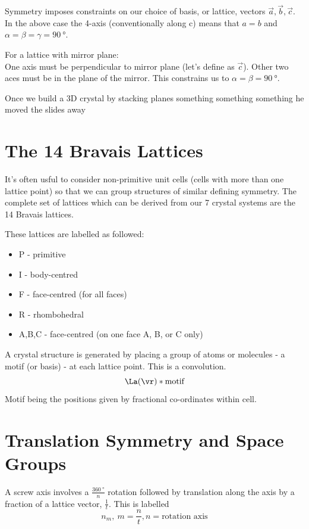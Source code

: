 \documentclass[a4paper, 11pt, normalem]{report}
\begin{document}
Symmetry imposes constraints on our choice of basis, or lattice, vectors $\vec{a},\vec{b},\vec{c}$.
In the above case the 4-axis (conventionally along c) means that $a=b$ and $\alpha=\beta=\gamma=\SI{90}{\degree}$.

For a lattice with mirror plane:\\
One axis must be perpendicular to mirror plane (let's define as $\vec{c}$).
Other two aces must be in the plane of the mirror.
This constrains us to $\alpha=\beta=\SI{90}{\degree}$.

Once we build a 3D crystal by stacking planes something something something he moved the slides away

\section{The 14 Bravais Lattices}
It's often usful to consider non-primitive unit cells (cells with more than one lattice point) so that we can group structures of similar defining symmetry.
The complete set of lattices which can be derived from our 7 crystal systems are the 14 Bravais lattices.

These lattices are labelled as followed:
\begin{itemize}
    \item P - primitive
    \item I - body-centred
    \item F - face-centred (for all faces)
    \item R - rhombohedral
    \item A,B,C - face-centred (on one face A, B, or C only)
\end{itemize}
A crystal structure is generated by placing a group of atoms or molecules - a motif (or basis) - at each lattice point.
This is a convolution.
\begin{equation}
    \La(\vr) \ast \text{motif}
\end{equation}
Motif being the positions given by fractional co-ordinates within cell.

\section{Translation Symmetry and Space Groups}

A screw axis involves a $\frac{\SI{360}{\degree}}{n}$ rotation followed by translation along the axis by a fraction of a lattice vector, $\frac{1}{t}$.
This is labelled
\begin{equation}
    n_m,~ m = \frac{n}{t}, n = \text{rotation axis}
\end{equation}
\end{document}
